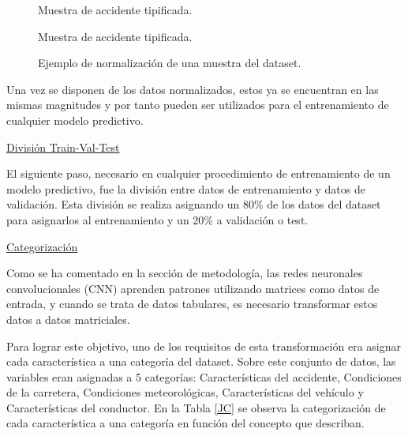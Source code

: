\documentclass{uathesis-es}
\begin{document}
{\begin{figure}[H]
\begin{c}
			\caption{Muestra de accidente tipificada.}
			\label{TFM_NormalizationExample:MuestraTipificada}
		\end{c}
		\begin{c}
			\centering
			
			\captionsetup{singlelinecheck = false, format= hang, justification=centering, font=footnotesize, labelsep=space}
			
			\caption{Muestra de accidente tipificada.}
			\label{TFM_NormalizationExample:MuestraNormalizada}
		\end{c}
		\caption{Ejemplo de normalización de una muestra del dataset.}
		\label{TFM_NormalizationExample}
	\end{figure}%
	
	
	Una vez se disponen de los datos normalizados, estos ya se encuentran en las mismas magnitudes y por tanto pueden ser utilizados para el entrenamiento de cualquier modelo predictivo.
	
	\underline{División Train-Val-Test}
	
	El siguiente paso, necesario en cualquier procedimiento de entrenamiento de un modelo predictivo, fue la división entre datos de entrenamiento y datos de validación. Esta división se realiza asignando un 80\% de los datos del dataset para asignarlos al entrenamiento y un 20\% a validación o test.
	
	
	\underline{Categorización}
	
	Como se ha comentado en la sección de metodología, las redes neuronales convolucionales (CNN) aprenden patrones utilizando matrices como datos de entrada, y cuando se trata de datos tabulares, es necesario transformar estos datos a datos matriciales.
	
	Para lograr este objetivo, uno de los requisitos de esta transformación era asignar cada característica a una categoría del dataset. Sobre este conjunto de datos, las variables eran asignadas a 5 categorías: Características del accidente, Condiciones de la carretera, Condiciones meteorológicas, Características del vehículo y Características del conductor. En la Tabla \ref{JC} se observa la categorización de cada característica a una categoría en función del concepto que describan.
	
	\begin{table}[H]
		\centering
		

\end{table}}
\end{document}
